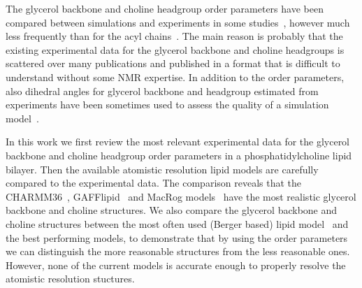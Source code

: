 \documentclass[pre,aps,floatfix,authordate1-4,twocolumn]{revtex4-1}
\begin{document}
The glycerol backbone and choline headgroup order parameters have been compared between simulations and experiments
in some studies~\cite{shinoda97,hogberg08,castro08,klauda10,kapla12,dickson12,poger12,ferreira13,chowdhary13,maciejewski14}, 
however much less frequently than for the acyl  chains~\cite{tieleman97,klauda08,edholm08,tieleman10,piggot12}.
The main reason is probably that the existing experimental data for the glycerol backbone
and choline headgroups is scattered over many publications and published in a format that is difficult to understand without some NMR expertise. 
In addition to the order parameters, also dihedral angles for glycerol backbone and headgroup estimated from experiments have been sometimes used to 
assess the quality of a simulation model~\cite{robinson94,essex94,kothekar96,hyvonen97,shinoda97,duong99}.

In this work we first review the most relevant experimental data for the glycerol backbone and choline headgroup order parameters
in a phosphatidylcholine lipid bilayer. Then the available atomistic resolution lipid models are carefully compared to the 
experimental data. The comparison reveals that the CHARMM36~\cite{klauda10}, GAFFlipid~\cite{dickson12} and MacRog models~\cite{maciejewski14}
have the most realistic glycerol backbone and choline structures. We also compare the glycerol backbone and choline 
structures between the most often used (Berger based) lipid model~\cite{berger97} 
and the best performing models, to demonstrate that by using the 
order parameters we can distinguish the more reasonable structures from the less reasonable ones. However, none of the current models 
is accurate enough to properly resolve the atomistic resolution stuctures.
\end{document}
